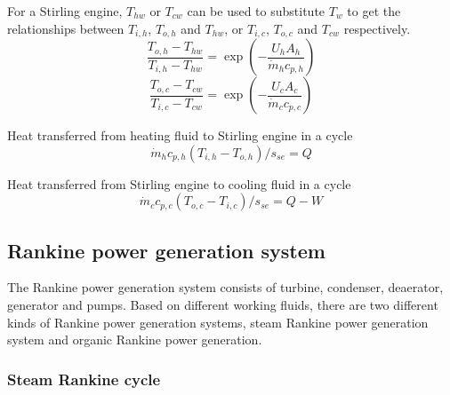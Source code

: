For a Stirling engine, $T_{hw}$ or $T_{cw}$ can be used to substitute $T_w$ to get the relationships between $T_{i,h}$, $T_{o,h}$ and $T_{hw}$, or $T_{i,c}$, $T_{o,c}$ and $T_{cw}$ respectively.
\begin{equation}
	\frac{T_{o,h}-T_{hw}}{T_{i,h}-T_{hw}}=\exp(-\frac{U_hA_h}{\dot{m}_hc_{p,h}})
	\label{Eq:T_h}
\end{equation}
\begin{equation}
	\frac{T_{o,c}-T_{cw}}{T_{i,c}-T_{cw}}=\exp(-\frac{U_cA_c}{\dot{m}_cc_{p,c}})
	\label{Eq:T_c}
\end{equation}

Heat transferred from heating fluid to Stirling engine in a cycle
\begin{equation}
	\dot{m}_hc_{p,h}(T_{i,h}-T_{o,h})/s_{se} = Q
	\label{Eq:q_h}
\end{equation}

Heat transferred from Stirling engine to cooling fluid in a cycle
\begin{equation}
	\dot{m}_cc_{p,c}(T_{o,c}-T_{i,c})/s_{se} = Q - W
	\label{Eq:q_c}
\end{equation}


\subsection{Rankine power generation system}

The Rankine power generation system consists of turbine, condenser, deaerator, generator and pumps. Based on different working fluids, there are two different kinds of Rankine power generation systems, steam Rankine power generation system and organic Rankine power generation.
\subsubsection{Steam Rankine cycle}
  
